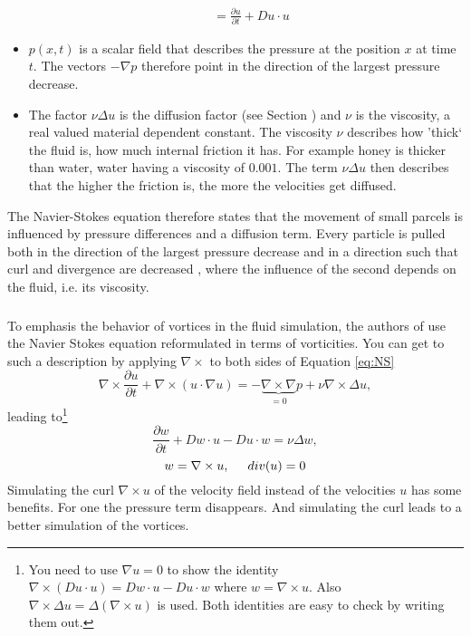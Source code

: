 \begin{itemize}
\begin{align*}
	&= \frac{\partial u}{\partial t} + Du \cdot u
	\end{align*}
	\item $p(x,t)$ is a scalar field that describes the pressure at the position $x$ at time $t$. The vectors $-\nabla p$ therefore point in the direction of the largest pressure decrease.
	\item The factor $\nu \Delta u$ is the diffusion factor (see Section ) and $\nu$ is the viscosity, a real valued material dependent constant. The viscosity $\nu$ describes how 'thick` the fluid is, how much internal friction it has. For example honey is thicker than water, water having a viscosity of $0.001$. The term $\nu \Delta u$ then describes that the higher the friction is, the more the velocities get diffused.
\end{itemize}

The Navier-Stokes equation therefore states that the movement of small parcels is influenced by pressure differences and a diffusion term. Every particle is pulled both in the direction of the largest pressure decrease and in a direction such that curl and divergence are decreased , where the influence of the second depends on the fluid, i.e. its viscosity.

\subsubsection*{}
To emphasis the behavior of vortices in the fluid simulation, the authors of  use the Navier Stokes equation reformulated in terms of vorticities. You can get to such a description by applying $\nabla \times$ to both sides of Equation \ref{eq:NS}
\[\nabla \times \frac{\partial u}{ \partial{t}} + \nabla \times (u \cdot \nabla u) = - \underbrace{\nabla\times \nabla}_{=0} p + \nu \nabla \times \Delta u,\]
leading to\footnote{You need to use $\nabla u = 0$ to show the identity $\nabla \times (Du \cdot u) = D w \cdot u - Du \cdot w$ where $w = \nabla \times u$. Also $\nabla \times \Delta u = \Delta (\nabla \times u)$ is used. Both identities are easy to check by writing them out. }
\[\frac{\partial w}{\partial t} + Dw\cdot u - Du \cdot w =  \nu \Delta w,\]
\begin{equation}w = \nabla \times u,\hspace{0.5cm} div(u) = 0\label{eq:NS2}\end{equation}
Simulating the curl $\nabla \times u$ of the velocity field instead of the velocities $u$ has some benefits. For one the pressure term disappears. And simulating the curl leads to a better simulation of the vortices. 

